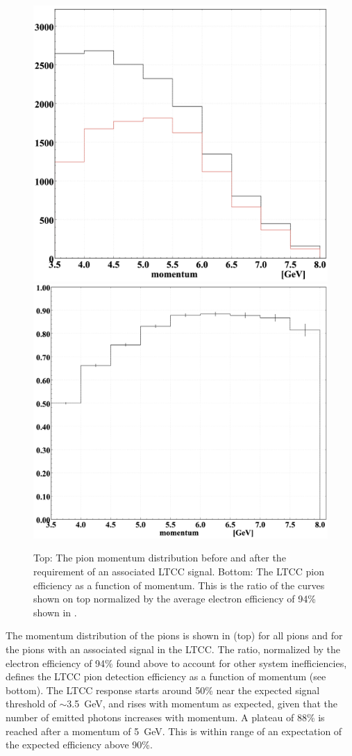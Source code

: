\begin{figure}[H]
	\centering
	\includegraphics[width=0.98\columnwidth, height=0.7\columnwidth]{img/pionMomentum.png}
	\includegraphics[width=0.98\columnwidth, height=0.7\columnwidth]{img/pionEfficiency.png}
	\caption{Top: The pion momentum distribution before and after the requirement of an associated LTCC signal.
          Bottom: The LTCC pion efficiency as a function of momentum. This is the ratio of the curves shown on top
          normalized by the average electron efficiency of 94\% shown in .}
	\label{fig:pionMomentum}
\end{figure}

The momentum distribution of the pions is shown in  (top) for all pions and for the pions with an
associated signal in the LTCC. The ratio, normalized by the electron efficiency of 94\% found above to account for
other system inefficiencies, defines the LTCC pion detection efficiency as a function of momentum (see
 bottom). The LTCC response starts around 50\% near the expected signal threshold of
$\sim$3.5~GeV, and rises with momentum as expected, given that the number of emitted photons increases with
momentum. A plateau of 88\% is reached after a momentum of 5~GeV. This is within range of an expectation of
the expected efficiency above 90\%.
